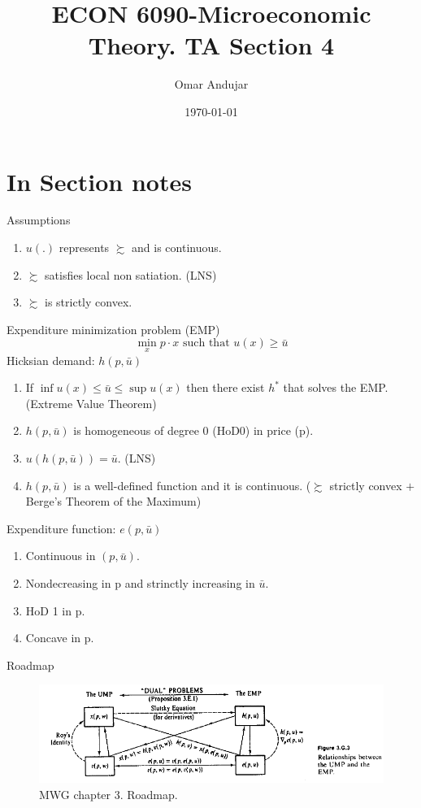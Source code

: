 \documentclass{article}
\title{ECON 6090-Microeconomic Theory. TA Section 4}
\author{Omar Andujar}
\date{\today}
\begin{document}
\raggedright
\pagestyle{fancy}
\fancyhf{}

\maketitle %

\section*{In Section notes}
Assumptions
\begin{enumerate}
    \item $u(.)$ represents $\succsim$ and is continuous.
    \item $\succsim$ satisfies local non satiation. (LNS)
    \item $\succsim$ is strictly convex.
\end{enumerate}

Expenditure minimization problem (EMP)
\[\min_x p \cdot x \text{ such that } u(x) \geq \bar{u}\]
Hicksian demand: $h(p,\bar{u})$
\begin{enumerate}
    \item If $\inf u(x) \leq \bar{u} \leq \sup u(x)$ then there exist $h^*$ that solves the EMP. (Extreme Value Theorem)
    \item $h(p,\bar{u})$ is homogeneous of degree 0 (HoD0) in price (p).
    \item $u(h(p,\bar{u})) = \bar{u}$. (LNS)
    \item $h(p,\bar{u})$ is a  well-defined function and it is continuous. ($\succsim$ strictly convex $+$ Berge's Theorem of the Maximum)
\end{enumerate}
Expenditure function: $e(p,\bar{u})$
\begin{enumerate}
    \item Continuous in $(p,\bar{u})$.
    \item Nondecreasing in p and strinctly increasing in $\bar{u}$.
    \item HoD 1 in p.
    \item Concave in p.
\end{enumerate}
Roadmap
  \begin{figure}[H]
    \centering
    \includegraphics{mwg_chapter3_duality.png}
    \caption{MWG chapter 3. Roadmap.}
    \label{fig:roadmap}
\end{figure}
\end{document}
